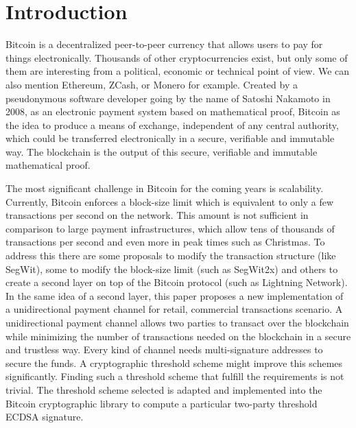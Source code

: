 \chapter{Introduction}
\label{chap:introduction}

Bitcoin is a decentralized peer-to-peer currency that allows users to pay for
things electronically. Thousands of other cryptocurrencies exist, but only some
of them are interesting from a political, economic or technical point of view.
We can also mention Ethereum, ZCash, or Monero for example. Created by a
pseudonymous software developer going by the name of Satoshi Nakamoto in 2008,
as an electronic payment system based on mathematical proof, Bitcoin as the idea
to produce a means of exchange, independent of any central authority, which
could be transferred electronically in a secure, verifiable and immutable way.
The blockchain is the output of this secure, verifiable and immutable
mathematical proof.

The most significant challenge in Bitcoin for the coming years is scalability.
Currently, Bitcoin enforces a block-size limit which is equivalent to only a few
transactions per second on the network. This amount is not sufficient in
comparison to large payment infrastructures, which allow tens of thousands of
transactions per second and even more in peak times such as Christmas.  To
address this there are some proposals to modify the transaction structure (like
SegWit), some to modify the block-size limit (such as SegWit2x) and others to
create a second layer on top of the Bitcoin protocol (such as Lightning
Network). In the same idea of a second layer, this paper proposes a new
implementation of a unidirectional payment channel for retail, commercial
transactions scenario. A unidirectional payment channel allows two parties to
transact over the blockchain while minimizing the number of transactions needed
on the blockchain in a secure and trustless way. Every kind of channel needs
multi-signature addresses to secure the funds. A cryptographic threshold scheme
might improve this schemes significantly. Finding such a threshold scheme that
fulfill the requirements is not trivial. The threshold scheme selected is
adapted and implemented into the Bitcoin cryptographic library to compute a
particular two-party threshold ECDSA signature.

